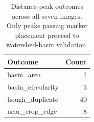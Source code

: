 \begin{table}[htbp]
\centering
\small
\caption{Distance-peak outcomes across all seven images. Only peaks passing marker placement proceed to watershed-basin validation.}
\label{tab:watershed-peaks}
\begin{tabular}{lr}
\toprule
Outcome & Count \\
\midrule
basin\_area & 1 \\
basin\_circularity & 3 \\
hough\_duplicate & 40 \\
near\_crop\_edge & 8 \\
\bottomrule
\end{tabular}
\end{table}
\FloatBarrier
